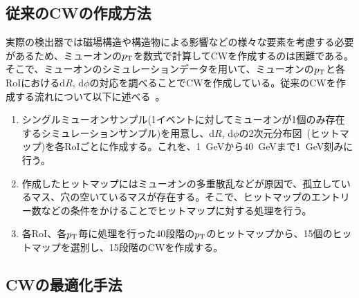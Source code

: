 \subsection{従来のCWの作成方法}
実際の検出器では磁場構造や構造物による影響などの様々な要素を考慮する必要があるため、ミューオンの$p_{\rm{T}}$を数式で計算してCWを作成するのは困難である。そこで、ミューオンのシミュレーションデータを用いて、ミューオンの$p_{\rm{T}}$と各RoIにおけるd$R$, d$\phi$の対応を調べることでCWを作成している。従来のCWを作成する流れについて以下に述べる~\cite{article:shiomi-mron}。
\begin{enumerate}\label{table:makeCW}
   \item シングルミューオンサンプル(1イベントに対してミューオンが1個のみ存在するシミュレーションサンプル)を用意し、d$R$, d$\phi$の2次元分布図~(ヒットマップ)を各RoIごとに作成する。これを、1~GeVから40~GeVまで1~GeV刻みに行う。
   \item 作成したヒットマップにはミューオンの多重散乱などが原因で、孤立しているマス、穴の空いているマスが存在する。そこで、ヒットマップのエントリー数などの条件をかけることでヒットマップに対する処理を行う。
   \item 各RoI、各$p_{\rm{T}}$毎に処理を行った40段階の$p_{\rm{T}}$のヒットマップから、15個のヒットマップを選別し、15段階のCWを作成する。
\end{enumerate}



\subsection{CWの最適化手法}
